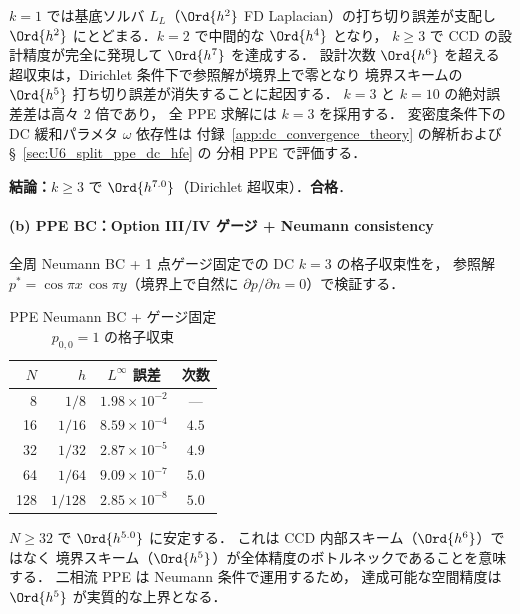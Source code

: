 $k = 1$ では基底ソルバ $L_L$（$\Ord{h^2}$ FD Laplacian）の打ち切り誤差が支配し
$\Ord{h^2}$ にとどまる．$k = 2$ で中間的な $\Ord{h^4}$ となり，
$k \geq 3$ で CCD の設計精度が完全に発現して $\Ord{h^7}$ を達成する．
設計次数 $\Ord{h^6}$ を超える超収束は，Dirichlet 条件下で参照解が境界上で零となり
境界スキームの $\Ord{h^5}$ 打ち切り誤差が消失することに起因する．
$k = 3$ と $k = 10$ の絶対誤差差は高々 2 倍であり，
全 PPE 求解には $k = 3$ を採用する．
変密度条件下の DC 緩和パラメタ $\omega$ 依存性は
付録~\ref{app:dc_convergence_theory} の解析および §~\ref{sec:U6_split_ppe_dc_hfe} の
分相 PPE で評価する．
\label{sec:verify_dc_spectral}%

\noindent\textbf{結論：}$k \geq 3$ で $\Ord{h^{7.0}}$（Dirichlet 超収束）．\textbf{合格}．

\paragraph{(b) PPE BC：Option III/IV ゲージ + Neumann consistency}
\label{sec:verify_ppe_neumann}

全周 Neumann BC + 1 点ゲージ固定での DC $k = 3$ の格子収束性を，
参照解 $p^* = \cos\pi x\,\cos\pi y$（境界上で自然に $\partial p/\partial n = 0$）で検証する．

\begin{table}[htbp]
\centering
\caption{PPE Neumann BC + ゲージ固定 $p_{0,0} = 1$ の格子収束}
\label{tab:ppe_neumann}
\renewcommand{\arraystretch}{1.2}
\footnotesize
\begin{tabular}{rr cc}
\toprule
$N$ & $h$ & $L^\infty$ 誤差 & 次数 \\
\midrule
  8 & $1/8$   & $1.98 \times 10^{-2}$ & ---   \\
 16 & $1/16$  & $8.59 \times 10^{-4}$ & $4.5$ \\
 32 & $1/32$  & $2.87 \times 10^{-5}$ & $4.9$ \\
 64 & $1/64$  & $9.09 \times 10^{-7}$ & $5.0$ \\
128 & $1/128$ & $2.85 \times 10^{-8}$ & $5.0$ \\
\bottomrule
\end{tabular}
\end{table}

$N \geq 32$ で $\Ord{h^{5.0}}$ に安定する．
これは CCD 内部スキーム（$\Ord{h^6}$）ではなく
境界スキーム（$\Ord{h^5}$）が全体精度のボトルネックであることを意味する．
二相流 PPE は Neumann 条件で運用するため，
達成可能な空間精度は $\Ord{h^5}$ が実質的な上界となる．


